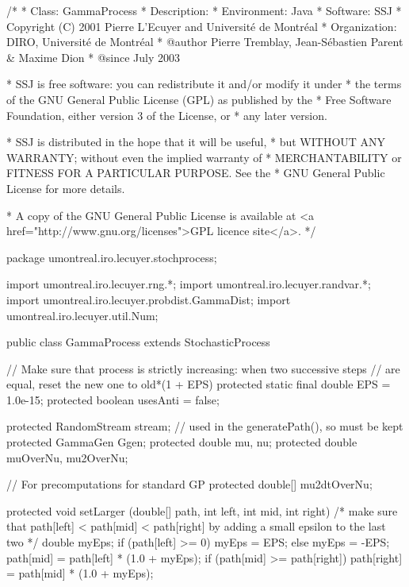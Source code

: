 \begin{code}
\begin{hide}
/*
 * Class:        GammaProcess
 * Description:  
 * Environment:  Java
 * Software:     SSJ 
 * Copyright (C) 2001  Pierre L'Ecuyer and Université de Montréal
 * Organization: DIRO, Université de Montréal
 * @author       Pierre Tremblay, Jean-Sébastien Parent & Maxime Dion
 * @since        July 2003

 * SSJ is free software: you can redistribute it and/or modify it under
 * the terms of the GNU General Public License (GPL) as published by the
 * Free Software Foundation, either version 3 of the License, or
 * any later version.

 * SSJ is distributed in the hope that it will be useful,
 * but WITHOUT ANY WARRANTY; without even the implied warranty of
 * MERCHANTABILITY or FITNESS FOR A PARTICULAR PURPOSE.  See the
 * GNU General Public License for more details.

 * A copy of the GNU General Public License is available at
   <a href="http://www.gnu.org/licenses">GPL licence site</a>.
 */
\end{hide}
package umontreal.iro.lecuyer.stochprocess;\begin{hide}
import umontreal.iro.lecuyer.rng.*;
import umontreal.iro.lecuyer.randvar.*;
import umontreal.iro.lecuyer.probdist.GammaDist;
import umontreal.iro.lecuyer.util.Num;
\end{hide}

public class GammaProcess extends StochasticProcess \begin{hide} {
   // Make sure that process is strictly increasing: when two successive steps
   // are equal, reset the new one to   old*(1 + EPS)
    protected static final double EPS = 1.0e-15;
    protected boolean      usesAnti = false;

    protected RandomStream stream; // used in the generatePath(), so must be kept
    protected GammaGen     Ggen;
    protected double       mu,
                           nu;
    protected double       muOverNu,
                           mu2OverNu;

    // For precomputations for standard GP
    protected double[]     mu2dtOverNu;

   protected void setLarger (double[] path, int left, int mid, int right) {
      /* make sure that path[left] < path[mid] < path[right] by adding a
         small epsilon to the last two */
      double myEps;
      if (path[left] >= 0)
         myEps = EPS;
      else
         myEps = -EPS;
      path[mid] = path[left] * (1.0 + myEps);
      if (path[mid] >= path[right])
         path[right] = path[mid] * (1.0 + myEps);
   }


}
\end{hide}
\end{code}
